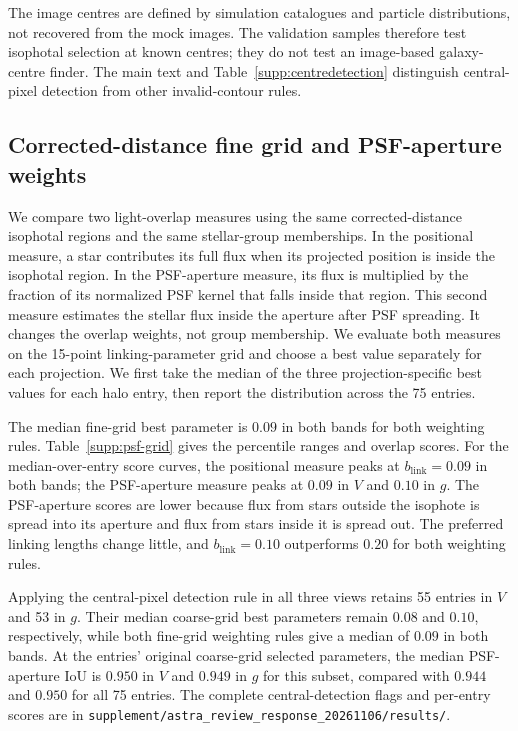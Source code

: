 \documentclass[usenatbib]{mnras}
\begin{document}
The image centres are defined by simulation catalogues and particle
distributions, not recovered from the mock images. The validation samples
therefore test isophotal selection at known centres; they do not test an
image-based galaxy-centre finder. The main text and
Table~\ref{supp:centredetection} distinguish central-pixel detection from
other invalid-contour rules.

\subsection{Corrected-distance fine grid and PSF-aperture weights}
\label{supp:psfweights}

We compare two light-overlap measures using the same corrected-distance
isophotal regions and the same stellar-group memberships. In the positional
measure, a star contributes its full flux when its projected position is
inside the isophotal region. In the PSF-aperture measure, its flux is
multiplied by the fraction of its normalized PSF kernel that falls inside
that region. This second measure estimates the stellar flux inside the
aperture after PSF spreading. It changes the overlap weights, not group
membership. We evaluate both measures on the 15-point linking-parameter
grid and choose a best value separately for each projection. We first take
the median of the three projection-specific best values for each halo
entry, then report the distribution across the 75 entries.

The median fine-grid best parameter is $0.09$ in both bands for both
weighting rules. Table~\ref{supp:psf-grid} gives the percentile ranges and
overlap scores. For the median-over-entry score curves, the positional
measure peaks at $b_{\mathrm{link}}=0.09$ in both bands; the PSF-aperture
measure peaks at $0.09$ in $V$ and $0.10$ in $g$. The PSF-aperture scores
are lower because flux from stars outside the isophote is spread into its
aperture and flux from stars inside it is spread out. The preferred
linking lengths change little, and $b_{\mathrm{link}}=0.10$ outperforms
$0.20$ for both weighting rules.

Applying the central-pixel detection rule in all three views retains 55
entries in $V$ and 53 in $g$. Their median coarse-grid best parameters
remain $0.08$ and $0.10$, respectively, while both fine-grid weighting
rules give a median of $0.09$ in both bands. At the entries' original
coarse-grid selected parameters, the median PSF-aperture IoU is $0.950$
in $V$ and $0.949$ in $g$ for this subset, compared with $0.944$ and
$0.950$ for all 75 entries. The complete central-detection flags and
per-entry scores are in
\texttt{supplement/astra\_review\_response\_20261106/results/}.
\end{document}

